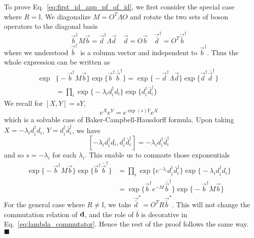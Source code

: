 To prove Eq.~\eqref{eq:first_id_app_pf_of_id}, we first consider the special case where $R=\mathbb{I}$. We diagonalize $M = O^{T} \Lambda O $ and rotate the two sets of boson operators to the diagonal basis
\begin{equation}
  \vec{b}^{\dagger}  M \vec{b} = \vec{d}^{\dagger} \Lambda \vec{d}  \quad \vec{d} = O \vec{b} \quad \vec{\bar{d}}^\dagger = O^T \vec{\bar{b}}^\dagger
\end{equation}
where we understood $\vec{\bar{b}}^\dagger$ is a column vector and independent to $\vec{{b}}^\dagger$. Thus the whole expression can be written as
\begin{equation}
\begin{aligned}
  \exp&\Big\{- \vec{b}^{\dagger} M \vec{b}  \Big\} \exp \Big\{ \vec{b}^{\dagger} \bar{\vec{b}}^\dagger  \Big\}  =  
  \exp\Big\{- \vec{d}^{\dagger} \Lambda \vec{d}  \Big\} \exp \Big\{   \vec{d}^{\dagger} \bar{\vec{d}}^\dagger  \Big\} \\
& = \prod_i  \exp\Big\{- \lambda_i d_i^{\dagger} d_i  \Big\} \exp \Big\{  d_i^{\dagger} \bar{d}_i ^{\dagger}  \Big\}
\end{aligned}
\end{equation}
We recall for $ [X, Y] = sY $, 
\begin{equation}
  e^X e^{Y} = e^{\exp (s ) Y} e^{X}
\end{equation}
which is a solvable case of Baker-Campbell-Hausdorff formula. Upon taking $X = -\lambda_i d_i^{\dagger} d_i$, $Y = d_i^{\dagger} \bar{d}^{\dagger}_i$, we have
\begin{equation}
\label{eq:lambda_commutator}
[- \lambda_i d_i^{\dagger} d_i, d_i ^{\dagger} \bar{d}_i^{\dagger}] =  - \lambda_i  d_i ^{\dagger} \bar{d}_i^{\dagger} 
\end{equation}
and so $s = - \lambda_i$ for each $\lambda_i$. This enable us to commute those exponentials
\begin{equation}
\begin{aligned}
 \exp\Big\{- \vec{b}^{\dagger} M \vec{b}  \Big\} \exp \Big\{  \vec{b}^{\dagger} \bar{\vec{b}}^\dagger  \Big\}   &= \prod_i \exp \Big\{ e^{- \lambda_i }  d^{\dagger}_i \bar{d}^{\dagger}_i  \Big\}  \exp \Big\{-\lambda_i  d^{\dagger}_i d_i  \Big\} \\
 & = \exp \Big\{ \vec{b}^{\dagger} e^{-M}  \bar{\vec{b}}^\dagger  \Big\} \exp\Big\{- \vec{b}^{\dagger} M \vec{b}  \Big\} 
\end{aligned}
\end{equation}
For the general case where $R \neq\mathbb{I}$, we take $\vec{\bar{d}}^* = O^T R \vec{\bar{b}}^*$. This will not change the commutation relation of ${\bf d}$, and the role of $\bar{b}$ is decorative in Eq.~\eqref{eq:lambda_commutator}. Hence the rest of the proof follows the same way. \hfill$\blacksquare$

